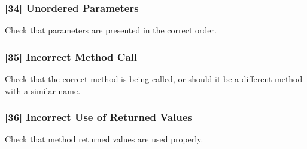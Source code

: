 \subsubsection{[34] Unordered Parameters}
Check that parameters are presented in the correct order.
\subsubsection{[35] Incorrect Method Call}
Check that the correct method is being called, or should it be a different method with a similar name.
\subsubsection{[36] Incorrect Use of Returned Values}
Check that method returned values are used properly.